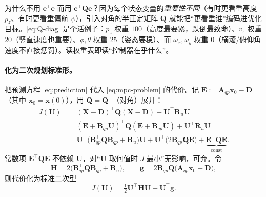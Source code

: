 \begin{insight}\label{ins:weight-Q}
为什么不用 $\mathbf{e}^\top\mathbf{e}$ 而用 $\mathbf{e}^\top\mathbf{Q}\mathbf{e}$？因为每个状态变量的\emph{重要性不同}（有时更看重高度 $p_z$、有时更看重偏航 $\psi$），引入对角的半正定矩阵 $\mathbf{Q}$ 就能把“更看重谁”编码进优化目标。\cref{eq:Q-diag} 是个活例子：$p_z$ 权重 $100$（高度最要紧，跌倒最致命）、$v_z$ 权重 $20$（竖直速度也重要）、$\phi,\theta$ 权重 $25$（姿态要稳）、而 $\omega_x,\omega_y$ 权重 $0$（横滚/俯仰角速度不直接惩罚）。读权重表即读“控制器在乎什么”。
\end{insight}

\paragraph{化为二次规划标准形。}
把预测方程 \cref{eq:prediction} 代入 \cref{eq:mpc-problem} 的代价。记 $\mathbf{E}:=\mathbf{A}_{qp}\boldsymbol{x}_0-\mathbf{D}$（其中 $\boldsymbol{x}_0=\boldsymbol{x}(0)$），用 $\mathbf{Q}=\mathbf{Q}^\top$（对角）展开\cite{yu2021quadruped}：
\begin{equation}
\begin{aligned}
  J(\mathbf{U}) &= (\mathbf{X}-\mathbf{D})^\top\mathbf{Q}(\mathbf{X}-\mathbf{D})+\mathbf{U}^\top\mathbf{R}_u\mathbf{U}\\
  &= (\mathbf{E}+\mathbf{B}_{qp}\mathbf{U})^\top\mathbf{Q}(\mathbf{E}+\mathbf{B}_{qp}\mathbf{U})+\mathbf{U}^\top\mathbf{R}_u\mathbf{U}\\
  &= \mathbf{U}^\top\big(\mathbf{B}_{qp}^\top\mathbf{Q}\mathbf{B}_{qp}+\mathbf{R}_u\big)\mathbf{U}+\mathbf{U}^\top\big(2\mathbf{B}_{qp}^\top\mathbf{Q}\mathbf{E}\big)+\underbrace{\mathbf{E}^\top\mathbf{Q}\mathbf{E}}_{\text{const}}.
\end{aligned}
\label{eq:cost-expand}
\end{equation}
常数项 $\mathbf{E}^\top\mathbf{Q}\mathbf{E}$ 不依赖 $\mathbf{U}$，对“$\mathbf{U}$ 取何值时 $J$ 最小”无影响，可弃。令\cite{yu2021quadruped}
\begin{equation}
  \mathbf{H}=2\big(\mathbf{B}_{qp}^\top\mathbf{Q}\mathbf{B}_{qp}+\mathbf{R}_u\big),\qquad
  \mathbf{g}=2\mathbf{B}_{qp}^\top\mathbf{Q}\big(\mathbf{A}_{qp}\boldsymbol{x}_0-\mathbf{D}\big),
  \label{eq:H-g}
\end{equation}
则代价化为标准二次型
\begin{equation}
  J(\mathbf{U})=\tfrac12\mathbf{U}^\top\mathbf{H}\mathbf{U}+\mathbf{U}^\top\mathbf{g}.
  \label{eq:qp-cost}
\end{equation}


